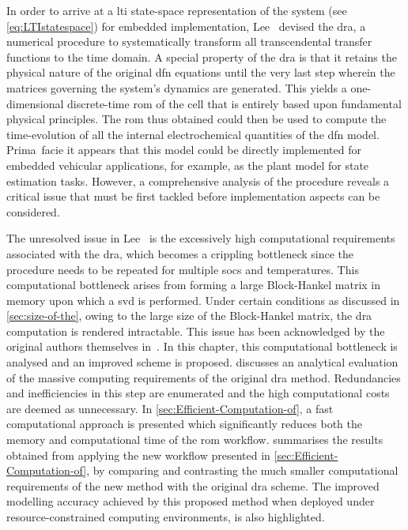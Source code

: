 In order to arrive at a  \gls{lti} state-space representation of the system (see
\cref{eq:LTIstatespace})  for embedded  implementation, Lee~\etal{}  devised the
\gls{dra}, a numerical procedure  to systematically transform all transcendental
transfer functions  to the time domain.  A special property of  the \gls{dra} is
that it  retains the physical nature  of the original \gls{dfn}  equations until
the very  last step  wherein the  matrices governing  the system's  dynamics are
generated. This  yields a  one-dimensional discrete-time  \gls{rom} of  the cell
that is entirely based upon  fundamental physical principles. The \gls{rom} thus
obtained could  then be used to  compute the time-evolution of  all the internal
electrochemical quantities of  the \gls{dfn} model. Prima~facie  it appears that
this model  could be directly  implemented for embedded  vehicular applications,
for  example,  as  the  plant  model for  state  estimation  tasks.  However,  a
comprehensive analysis  of the procedure reveals  a critical issue that  must be
first tackled before implementation aspects can be considered.

The  unresolved  issue in  Lee~\etal{}  is  the excessively  high  computational
requirements associated with the \gls{dra}, which becomes a crippling bottleneck
since  the  procedure  needs  to   be  repeated  for  multiple  \glspl{soc}  and
temperatures.  This  computational  bottleneck   arises  from  forming  a  large
Block-Hankel  matrix  in memory  upon  which  a  \gls{svd} is  performed.  Under
certain conditions  as discussed in  \cref{sec:size-of-the}, owing to  the large
size  of  the  Block-Hankel  matrix,   the  \gls{dra}  computation  is  rendered
intractable. This issue has been acknowledged by the original authors themselves
in~\cite{Lee2012,Plett2015}.  In  this  chapter, this  computational  bottleneck
is  analysed  and an  improved  scheme  is proposed.  
discusses an analytical evaluation of  the massive computing requirements of the
original  \gls{dra} method.  Redundancies and  inefficiencies in  this step  are
enumerated  and the  high  computational  costs are  deemed  as unnecessary.  In
\cref{sec:Efficient-Computation-of}, a fast  computational approach is presented
which  significantly reduces  both  the  memory and  computational  time of  the
\gls{rom}  workflow.   summarises  the  results obtained  from
applying the  new workflow presented in  \cref{sec:Efficient-Computation-of}, by
comparing and contrasting the much smaller computational requirements of the new
method  with the  original  \gls{dra} scheme.  The  improved modelling  accuracy
achieved  by  this  proposed  method when  deployed  under  resource-constrained
computing environments, is also highlighted.

